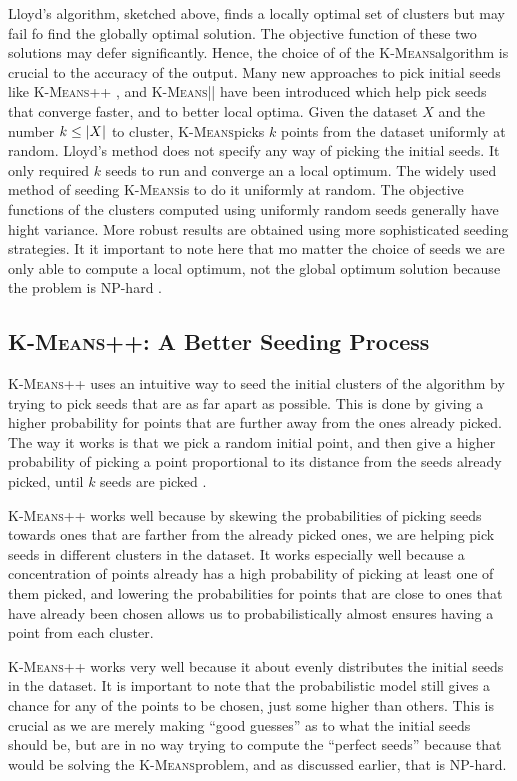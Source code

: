 \documentclass[12pt]{dalthesis}
\newcommand*{\kmeansn}{\textsc{K-Means}} %
\newcommand*{\kmeans}{\kmeansn } %
\DeclarePairedDelimiter\abs{\lvert}{\rvert}
\begin{document}
Lloyd's algorithm, sketched above, finds a locally optimal set of clusters but may fail fo find the globally optimal solution. The objective function of these two solutions may defer significantly. Hence, the choice of of the \kmeans algorithm is crucial to the accuracy of the output.
Many new approaches to pick initial seeds like \kmeansn++ \citep{arthur2007k}, and \kmeansn|| \citep{bahmani2012scalable} have been introduced which help pick seeds that converge faster, and to better local optima. Given the dataset $X$ and the number $k\leq \abs{X}$ to cluster, \kmeans picks $k$ points from the dataset uniformly at random. Lloyd's method does not specify any way of picking the initial seeds. It only required $k$ seeds to run and converge an a local optimum. The widely used method of seeding \kmeans  is to do it uniformly at random. The objective functions of the clusters computed using uniformly random seeds generally have hight variance. More robust results are obtained using more sophisticated seeding strategies. It it important to note here that mo matter the choice of seeds we are only able to compute a local optimum, not the global optimum solution because the problem is NP-hard \citep{mahajan2009planar}. 

\subsection{\kmeansn++: A Better Seeding Process}
\kmeansn++ uses an intuitive way to seed the initial clusters of the algorithm by trying to pick seeds that are as far apart as possible. This is done by giving a higher probability for points that are further away from the ones already picked. The way it works is that we pick a random initial point, and then give a higher probability of picking a point proportional to its distance from the seeds already picked, until $k$ seeds are picked \citep{arthur2007k}.

\kmeansn++ works well because by skewing the probabilities of picking seeds towards ones that are farther from the already picked ones, we are helping pick seeds in different clusters in the dataset. It works especially well because a concentration of points already has a high probability of picking at least one of them picked, and lowering the probabilities for points that are close to ones that have already been chosen allows us to probabilistically almost ensures having a point from each cluster.

\kmeansn++ works very well because it about evenly distributes the initial seeds in the dataset. It is important to note that the probabilistic model still gives a chance for any of the points to be chosen, just some higher than others. This is crucial as we are merely making ``good guesses'' as to what the initial seeds should be, but are in no way trying to compute the ``perfect seeds'' because that would be solving the \kmeans problem, and as discussed earlier, that is NP-hard.
\end{document}
